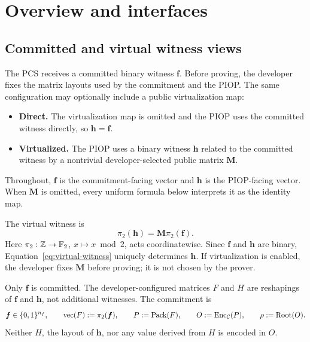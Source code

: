 \section{Overview and interfaces}
\label{sec:overview}

\begingroup\small

\subsection{Committed and virtual witness views}
\label{sec:public-objects}

The PCS receives a committed binary witness $\bm f$.  Before proving, the
developer fixes the matrix layouts used by the commitment and the PIOP.
The same configuration may optionally include a public virtualization map:

\begin{itemize}[leftmargin=1.4em]
 \item \textbf{Direct.}
       The virtualization map is omitted and the PIOP uses the
       committed witness directly, so $\bm h=\bm f$.
 \item \textbf{Virtualized.}
       The PIOP uses a binary witness $\bm h$ related to the
       committed witness by a nontrivial developer-selected public matrix
       $\bm M$.
\end{itemize}

Throughout, $\bm f$ is the commitment-facing vector and $\bm h$ is the
PIOP-facing vector.  When $\bm M$ is omitted, every uniform formula
below interprets it as the identity map.

The virtual witness is
\begin{equation}
 \boxed{\quad
 \pi_2(\bm h)=\bm M\pi_2(\bm f).
 \quad}
 \label{eq:virtual-witness}
\end{equation}
Here $\pi_2:\mathbb Z\to\mathbb F_2$, $x\mapsto x\bmod 2$, acts coordinatewise.
Since $\bm f$ and $\bm h$ are binary, Equation~\eqref{eq:virtual-witness}
uniquely determines $\bm h$.  If virtualization is enabled, the developer
fixes $\bm M$ before proving; it is not chosen by the prover.

Only $\bm f$ is committed.  The developer-configured matrices $F$ and $H$ are
reshapings of $\bm f$ and $\bm h$, not additional witnesses.  The commitment is
\begin{equation}
 \bm f\in\{0,1\}^{n_f},\qquad
 \operatorname{vec}(F):=\pi_2(\bm f),\qquad
 P:=\operatorname{Pack}(F),\qquad
 O:=\operatorname{Enc}_{\mathcal C}(P),\qquad
 \rho:=\operatorname{Root}(O).
 \label{eq:overview-commitment}
\end{equation}
Neither $H$, the layout of $\bm h$, nor any value derived from $H$ is encoded
in $O$.

